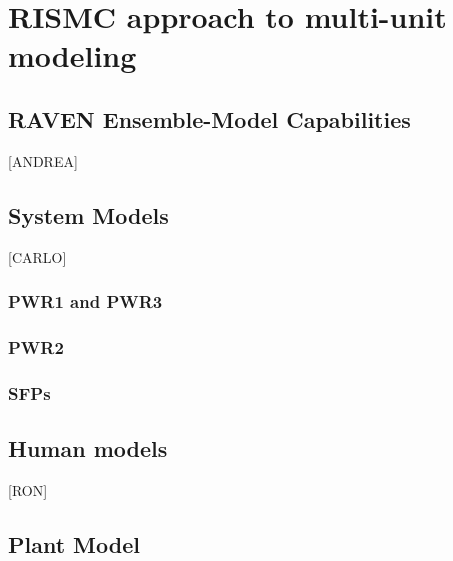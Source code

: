 \section{RISMC approach to multi-unit modeling}
\label{sec:RISMC_MU_modeling}

\subsection{RAVEN Ensemble-Model Capabilities}
[ANDREA]

\subsection{System Models}
[CARLO]
\subsubsection{PWR1 and PWR3}

\subsubsection{PWR2}

\subsubsection{SFPs}

\subsection{Human models}
[RON]

\subsection{Plant Model}
